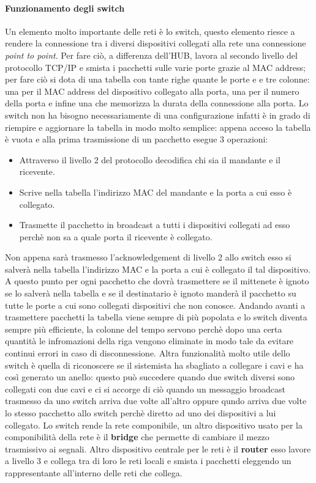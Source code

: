\documentclass{article}
\begin{document}
\paragraph{Funzionamento degli switch}
Un elemento molto importante delle reti è lo switch, questo elemento riesce a
rendere la connessione tra i diversi dispositivi collegati alla rete una
connessione \textit{point to point}. Per fare ciò, a differenza dell'HUB,
lavora al secondo livello del protocollo TCP/IP e smista i pacchetti sulle
varie porte grazie al MAC address; per fare ciò si dota di una tabella con
tante righe quante le porte e e tre colonne: una per il MAC address del
dispositivo collegato alla porta, una per il numero della porta e infine una
che memorizza la durata della connessione alla porta. Lo switch non ha bisogno
necessariamente di una configurazione infatti è in grado di riempire e
aggiornare la tabella in modo molto semplice: appena acceso la tabella è vuota
e alla prima trasmissione di un pacchetto esegue 3 operazioni:
\begin{itemize}
    \item Attraverso il livello 2 del protocollo decodifica chi sia il mandante e il
          ricevente.
    \item Scrive nella tabella l'indirizzo MAC del mandante e la porta a cui esso è
          collegato.
    \item Trasmette il pacchetto in broadcast a tutti i dispositivi collegati ad esso
          perchè non sa a quale porta il ricevente è collegato.
\end{itemize}
Non appena sarà trasmesso l'acknowledgement di livello 2 allo switch esso si salverà nella tabella l'indirizzo MAC e la porta a cui è collegato il tal dispositivo.
A questo punto per ogni pacchetto che dovrà trasmettere se il mittenete è ignoto se lo salverà nella tabella e se il destinatario è ignoto manderà il pacchetto su tutte le porte a cui sono
collegati dispositivi che non conosce. Andando avanti a trasmettere pacchetti la tabella viene sempre di più popolata e lo switch diventa sempre più efficiente, la colonne del tempo servono perchè
dopo una certa quantità le infromazioni della riga vengono eliminate in modo tale da evitare continui errori in caso di disconnessione. Altra funzionalità molto utile dello switch è quella
di riconoscere se il sistemista ha sbagliato a collegare i cavi e ha così generato un anello: questo può succedere quando due switch diversi sono collegati con due cavi e ci si accorge di ciò
quando un messaggio broadcast trasmesso da uno switch arriva due volte all'altro oppure qundo arriva due volte lo stesso pacchetto allo switch perchè diretto ad uno dei dispositivi a lui collegato.
Lo switch rende la rete componibile, un altro dispositivo usato per la componibilità della rete è il \textbf{bridge} che permette di cambiare il mezzo trasmissivo ai segnali. Altro dispositivo
centrale per le reti è il \textbf{router} esso lavore a livello 3 e collega tra di loro le reti locali e smista i pacchetti eleggendo un rappresentante all'interno delle reti che collega.
\end{document}
